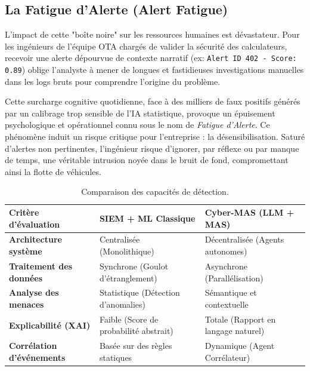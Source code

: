 \documentclass[a4paper, 12pt]{report}
\begin{document}
\subsection{La Fatigue d'Alerte (Alert Fatigue)}
L'impact de cette "boîte noire" sur les ressources humaines est dévastateur. Pour les ingénieurs de l'équipe OTA chargés de valider la sécurité des calculateurs, recevoir une alerte dépourvue de contexte narratif (ex: \texttt{Alert ID 402 - Score: 0.89}) oblige l'analyste à mener de longues et fastidieuses investigations manuelles dans les logs bruts pour comprendre l'origine du problème. 

Cette surcharge cognitive quotidienne, face à des milliers de faux positifs générés par un calibrage trop sensible de l'IA statistique, provoque un épuisement psychologique et opérationnel connu sous le nom de \textit{Fatigue d'Alerte}. Ce phénomène induit un risque critique pour l'entreprise : la désensibilisation. Saturé d'alertes non pertinentes, l'ingénieur risque d'ignorer, par réflexe ou par manque de temps, une véritable intrusion noyée dans le bruit de fond, compromettant ainsi la flotte de véhicules.

\begin{table}[htbp]
\centering
\caption[Comparaison des capacités de détection]{Comparaison des capacités de détection.}
\label{tab:comparaison_siem_mas}
\vspace{0.2cm}
\begin{tabular}{|>{\raggedright\arraybackslash}p{4.5cm}|>{\raggedright\arraybackslash}p{4.5cm}|>{\raggedright\arraybackslash}p{5cm}|}
\hline
\textbf{Critère d'évaluation} & \textbf{SIEM + ML Classique} & \textbf{Cyber-MAS (LLM + MAS)} \\ \hline
\textbf{Architecture système} & Centralisée (Monolithique) & Décentralisée (Agents autonomes) \\ \hline
\textbf{Traitement des données} & Synchrone (Goulot d'étranglement) & Asynchrone (Parallélisation) \\ \hline
\textbf{Analyse des menaces} & Statistique (Détection d'anomalies) & Sémantique et contextuelle \\ \hline
\textbf{Explicabilité (XAI)} & Faible (Score de probabilité abstrait) & Totale (Rapport en langage naturel) \\ \hline
\textbf{Corrélation d'événements} & Basée sur des règles statiques & Dynamique (Agent Corrélateur) \\ \hline
\end{tabular}
\end{table}
\end{document}
